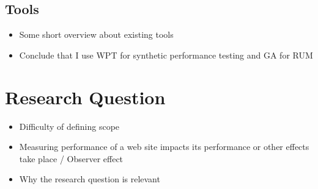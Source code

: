 



\subsection{Tools}


\begin{itemize}
\item Some short overview about existing tools
\item Conclude that I use WPT for synthetic performance testing and GA for RUM
\end{itemize}










\section{Research Question}

\begin{itemize}
\item Difficulty of defining scope
\item Measuring performance of a web site impacts its performance or other effects take place / Observer effect
\item Why the research question is relevant
\end{itemize}


























